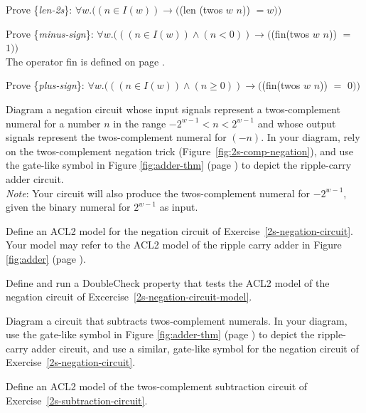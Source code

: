 \begin{ExerciseList}

\Exercise \label{len-2s}
Prove \{\emph{len-2s}\}:
$\forall w.((n \in I(w)) \rightarrow ($\textsf{(len (twos $w$ $n$))} $= w))$

\Exercise \label{minus-sign}
Prove \{\emph{minus-sign}\}:
$\forall w.(((n \in I(w)) \wedge (n < 0)) \rightarrow ($\textsf{(fin(twos $w$ $n$))} $=$ $1))$\\
The operator \textsf{fin} is defined on page \pageref{fin-defun}.

\Exercise \label{plus-sign}
Prove \{\emph{plus-sign}\}:
$\forall w.(((n \in I(w)) \wedge (n \geq 0)) \rightarrow ($\textsf{(fin(twos $w$ $n$))} $=$ $0))$

\Exercise \label{2s-negation-circuit}
Diagram a negation circuit whose input signals represent a
twos-complement numeral for a number $n$ in the range
$-2^{w-1} < n < 2^{w-1}$
and whose output signals represent
the twos-complement numeral for $(-n)$.
In your diagram, rely on the twos-complement negation trick
(Figure~\ref{fig:2s-comp-negation}),
and use the gate-like symbol in
Figure \ref{fig:adder-thm} (page \pageref{fig:adder-thm})
to depict the ripple-carry adder circuit.\\
\emph{Note}: Your circuit will also produce the twos-complement
numeral for $-2^{w-1}$, given the binary numeral for $2^{w-1}$
as input.

\Exercise \label{2s-negation-circuit-model}
Define an ACL2 model for the negation circuit
of Exercise~\ref{2s-negation-circuit}.
Your model may refer to the ACL2 model
of the ripple carry adder in
Figure \ref{fig:adder} (page \pageref{fig:adder}).

\Exercise Define and run a DoubleCheck property that
tests the ACL2 model of the negation circuit of
Excercise~\ref{2s-negation-circuit-model}.

\Exercise \label{2s-subtraction-circuit}
Diagram a circuit that subtracts twos-complement numerals.
In your diagram, use the gate-like symbol in
Figure \ref{fig:adder-thm} (page \pageref{fig:adder-thm})
to depict the ripple-carry adder circuit,
and use a similar, gate-like symbol for the negation circuit
of Exercise~\ref{2s-negation-circuit}.

\Exercise \label{2s-subtraction-circuit-model}
Define an ACL2 model of the twos-complement
subtraction circuit of Exercise~\ref{2s-subtraction-circuit}.


\end{ExerciseList}
